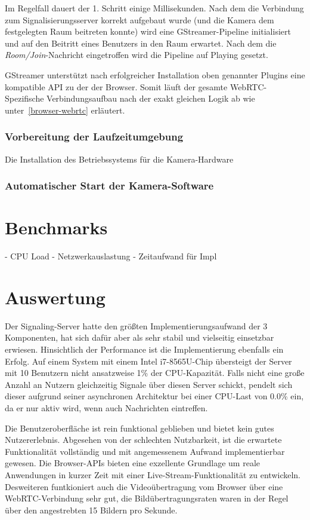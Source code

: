 \documentclass{article}
\begin{document}
\begin{onecolumn}
Im Regelfall dauert der 1. Schritt einige Millisekunden. Nach dem die
Verbindung zum Signalisierungsserver korrekt aufgebaut wurde (und die Kamera
dem festgelegten Raum beitreten konnte) wird eine GStreamer-Pipeline
initialisiert und auf den Beitritt eines Benutzers in den Raum erwartet. Nach
dem die \textit{Room/Join}-Nachricht eingetroffen wird die Pipeline auf Playing
gesetzt.

GStreamer unterstützt nach erfolgreicher Installation oben genannter Plugins
eine kompatible API zu der der Browser. Somit läuft der gesamte
WebRTC-Spezifische Verbindungsaufbau nach der exakt gleichen Logik ab wie
unter\ \ref{browser-webrtc} erläutert.

\subsubsection{Vorbereitung der Laufzeitumgebung}

Die Installation des Betriebssystems für die Kamera-Hardware 

\subsubsection{Automatischer Start der Kamera-Software}

\section{Benchmarks}

- CPU Load
- Netzwerkauslastung
- Zeitaufwand für Impl

\section{Auswertung}

Der Signaling-Server hatte den größten Implementierungsaufwand der 3
Komponenten, hat sich dafür aber als sehr stabil und vielseitig einsetzbar
erwiesen. Hinsichtlich der Performance ist die Implementierung ebenfalls ein
Erfolg. Auf einem System mit einem Intel i7-8565U-Chip übersteigt der Server
mit 10 Benutzern nicht ansatzweise 1\% der CPU-Kapazität. Falls nicht eine
große Anzahl an Nutzern gleichzeitig Signale über diesen Server schickt,
pendelt sich dieser aufgrund seiner asynchronen Architektur bei einer
CPU-Last von 0.0\% ein, da er nur aktiv wird, wenn auch Nachrichten
eintreffen.

Die Benutzeroberfläche ist rein funktional geblieben und bietet kein gutes
Nutzererlebnis. Abgesehen von der schlechten Nutzbarkeit, ist die erwartete
Funktionalität vollständig und mit angemessenem Aufwand implementierbar
gewesen. Die Browser-APIs bieten eine exzellente Grundlage um reale
Anwendungen in kurzer Zeit mit einer Live-Stream-Funktionalität zu entwickeln.
Desweiteren funtkioniert auch die Videoübertragung vom Browser über eine
WebRTC-Verbindung sehr gut, die Bildübertragungsraten waren in der
Regel über den angestrebten 15 Bildern pro Sekunde.


\end{onecolumn}
\end{document}
